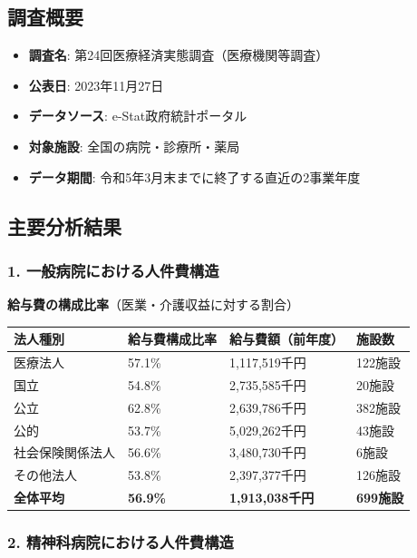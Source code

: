 \documentclass[
  a4paper,
  a4paper,
  11pt]{ltjsbook}
\providecommand{\tightlist}{%
  \setlength{\itemsep}{0pt}\setlength{\parskip}{0pt}}
\begin{document}
\subsection{調査概要}\label{ux8abfux67fbux6982ux8981}

\begin{itemize}
\tightlist
\item
  \textbf{調査名}: 第24回医療経済実態調査（医療機関等調査）
\item
  \textbf{公表日}: 2023年11月27日
\item
  \textbf{データソース}: e-Stat政府統計ポータル
\item
  \textbf{対象施設}: 全国の病院・診療所・薬局
\item
  \textbf{データ期間}: 令和5年3月末までに終了する直近の2事業年度
\end{itemize}

\subsection{主要分析結果}\label{ux4e3bux8981ux5206ux6790ux7d50ux679c}

\subsubsection{1.
一般病院における人件費構造}\label{ux4e00ux822cux75c5ux9662ux306bux304aux3051ux308bux4ebaux4ef6ux8cbbux69cbux9020}

\textbf{給与費の構成比率}（医業・介護収益に対する割合）

\begin{longtable}[]{@{}llll@{}}
\toprule\noalign{}
法人種別 & 給与費構成比率 & 給与費額（前年度） & 施設数 \\
\midrule\noalign{}
\endhead
\bottomrule\noalign{}
\endlastfoot
医療法人 & 57.1\% & 1,117,519千円 & 122施設 \\
国立 & 54.8\% & 2,735,585千円 & 20施設 \\
公立 & 62.8\% & 2,639,786千円 & 382施設 \\
公的 & 53.7\% & 5,029,262千円 & 43施設 \\
社会保険関係法人 & 56.6\% & 3,480,730千円 & 6施設 \\
その他法人 & 53.8\% & 2,397,377千円 & 126施設 \\
\textbf{全体平均} & \textbf{56.9\%} & \textbf{1,913,038千円} &
\textbf{699施設} \\
\end{longtable}

\subsubsection{2.
精神科病院における人件費構造}\label{ux7cbeux795eux79d1ux75c5ux9662ux306bux304aux3051ux308bux4ebaux4ef6ux8cbbux69cbux9020}
\end{document}

